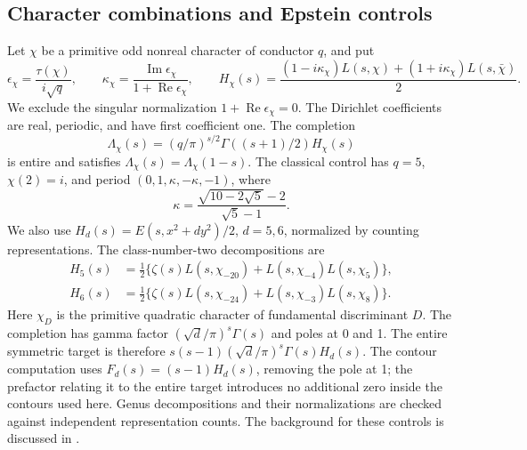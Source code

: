 \documentclass[11pt]{article}
\theoremstyle{remark}
\DeclareMathOperator{\Rea}{Re}
\DeclareMathOperator{\Ima}{Im}
\begin{document}
\subsection{Character combinations and Epstein controls}
Let \(\chi\) be a primitive odd nonreal character of conductor \(q\), and put
\begin{equation}\label{eq:character}
 \epsilon_\chi=\frac{\tau(\chi)}{i\sqrt q},\qquad
 \kappa_\chi=\frac{\Ima\epsilon_\chi}{1+\Rea\epsilon_\chi},\qquad
 H_\chi(s)=\frac{(1-i\kappa_\chi)L(s,\chi)
                    +(1+i\kappa_\chi)L(s,\bar\chi)}2.
\end{equation}
We exclude the singular normalization \(1+\Rea\epsilon_\chi=0\).
The Dirichlet coefficients are real, periodic, and have first coefficient
one. The completion
\begin{equation}\label{eq:completion}
 \Lambda_\chi(s)=(q/\pi)^{s/2}\Gamma((s+1)/2)H_\chi(s)
\end{equation}
is entire and satisfies \(\Lambda_\chi(s)=\Lambda_\chi(1-s)\).
The classical control has \(q=5\), \(\chi(2)=i\), and period
\((0,1,\kappa,-\kappa,-1)\), where
\begin{equation}\label{eq:dhkappa}
 \kappa=\frac{\sqrt{10-2\sqrt5}-2}{\sqrt5-1}.
\end{equation}
We also use \(H_d(s)=E(s,x^2+dy^2)/2\), \(d=5,6\), normalized by
counting representations. The class-number-two decompositions are
\begin{align}
 H_5(s)&=\tfrac12\{\zeta(s)L(s,\chi_{-20})
                         +L(s,\chi_{-4})L(s,\chi_5)\},\label{eq:epstein5}\\
 H_6(s)&=\tfrac12\{\zeta(s)L(s,\chi_{-24})
                         +L(s,\chi_{-3})L(s,\chi_8)\}.\label{eq:epstein6}
\end{align}
Here \(\chi_D\) is the primitive quadratic character of fundamental
discriminant \(D\). The completion has gamma factor
\((\sqrt d/\pi)^s\Gamma(s)\) and poles at 0 and 1.
The entire symmetric target is therefore
\(s(s-1)(\sqrt d/\pi)^s\Gamma(s)H_d(s)\).
The contour computation uses \(F_d(s)=(s-1)H_d(s)\), removing the pole at 1;
the prefactor relating it to the entire target introduces no additional
zero inside the contours used here. Genus decompositions and their
normalizations are checked against independent representation counts.
The background for these controls is discussed in \cite{bombieriGhosh2011}.
\end{document}
